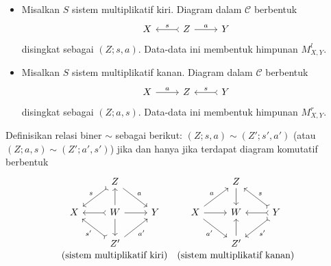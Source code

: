\begin{itemize}
	\item Misalkan $S$ sistem multiplikatif kiri. Diagram dalam $\mathcal{C}$
	berbentuk
	\[
	\begin{tikzcd} X & Z \arrow[rightarrowtail, l, "s"'] \arrow[r, "a"] & Y \end{tikzcd}
	\]
	disingkat sebagai $(Z; s, a)$. Data-data ini membentuk himpunan
	$M_{X,Y}^l$.
	\item Misalkan $S$ sistem multiplikatif kanan. Diagram dalam $\mathcal{C}$
	berbentuk
	\[
	\begin{tikzcd} X \arrow[r, "a"] & Z & Y \arrow[rightarrowtail, l, "s"'] \end{tikzcd}
	\]
	disingkat sebagai $(Z; a, s)$. Data-data ini membentuk himpunan
	$M_{X,Y}^r$.
\end{itemize}

Definisikan relasi biner $\sim$ sebagai berikut:
$(Z; s, a) \sim (Z'; s', a')$ (atau
$(Z; a, s) \sim (Z'; a', s')$) jika dan hanya jika terdapat diagram
komutatif berbentuk
\begin{equation}\label{eqn:localization-sim}
	\begin{array}{cc}
		\begin{tikzcd}
			& Z \arrow[rightarrowtail, ld, "s"'] \arrow[rd, "a"] & \\
			X & W \arrow[rightarrowtail, l] \arrow[r] \arrow[u] \arrow[d] & Y \\
			& Z' \arrow[rightarrowtail, lu, "{s'}"] \arrow[ru, "{a'}"'] &
		\end{tikzcd} & 
		\begin{tikzcd}
			& Z \arrow[d] & \\
			X \arrow[r] \arrow[ru, "a"] \arrow[rd, "{a'}"'] & W & Y \arrow[rightarrowtail, l] \arrow[rightarrowtail, lu, "s"'] \arrow[rightarrowtail, ld, "{s'}"] \\
			& Z' \arrow[u] &
		\end{tikzcd} \\
		\text{(sistem multiplikatif kiri)} & \text{(sistem multiplikatif kanan)}
	\end{array}\end{equation}


